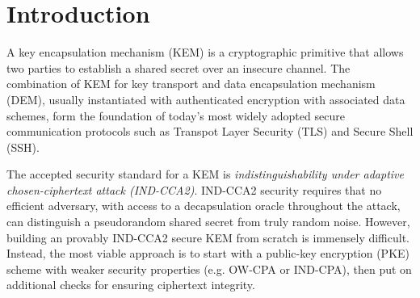 \documentclass[journal=tches,submission]{iacrtrans}
\begin{document}


\section{Introduction}\label{sec:introduction}
A key encapsulation mechanism (KEM) is a cryptographic primitive that allows two parties to establish a shared secret over an insecure channel. The combination of KEM for key transport and data encapsulation mechanism (DEM), usually instantiated with authenticated encryption with associated data schemes, form the foundation of today's most widely adopted secure communication protocols such as Transpot Layer Security (TLS) and Secure Shell (SSH).

The accepted security standard for a KEM is \emph{indistinguishability under adaptive chosen-ciphertext attack (IND-CCA2)}. IND-CCA2 security requires that no efficient adversary, with access to a decapsulation oracle throughout the attack, can distinguish a pseudorandom shared secret from truly random noise. However, building an provably IND-CCA2 secure KEM from scratch is immensely difficult. Instead, the most viable approach is to start with a public-key encryption (PKE) scheme with weaker security properties (e.g. OW-CPA or IND-CPA), then put on additional checks for ensuring ciphertext integrity.
\end{document}
